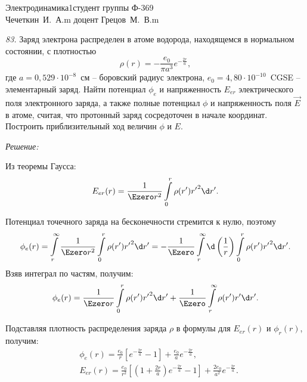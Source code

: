 






{Электродинамика}{1}{}{студент группы Ф-369\\Чечеткин~И.~А.}{m}
{доцент Грецов~М.~В.}{m}

\newpage
\emph{83.} Заряд электрона распределен в атоме водорода, находящемся в
нормальном состоянии, с плотностью
\[
  \rho(r) = -\frac{e_0}{\pi a^3}e^{-\frac{2r}{a}},
\]
где \( a = 0,529\cdot10^{-8} \)~см -- боровский радиус электрона,
\( e_0 = 4,80\cdot10^{-10} \)~CGSE -- элементарный заряд. Найти потенциал
\( \phi_e \) и напряженность \( E_{er} \) электрического поля электронного заряда,
а также полные потенциал \( \phi \) и напряженность поля \( \vec{E} \) в атоме,
считая, что протонный заряд сосредоточен в начале координат. Построить
приблизительный ход величин \( \phi \) и \( E \).

\vspace*{2em}
\emph{Решение:}
    
    Из теоремы Гаусса:
    \[
        E_{er}(r) = \frac{1}{\Ezero r^2} \int\limits_0^r \rho(r'){r'}^2\d r'.
    \]
    
    Потенциал точечного заряда на бесконечности стремится к нулю, поэтому
    \[
        \phi_e(r) = \int\limits_r^\infty \frac{1}{\Ezero r^2}\int\limits_0^r \rho(r')
        {r'}^2\d r' = -\frac{1}{\Ezero}\int\limits_r^\infty \d\left(\frac{1}{r}
        \right)\int\limits_0^r \rho(r'){r'}^2\d r'.
    \]
    Взяв интеграл по частям, получим:
    \[
        \phi_e(r) = \frac{1}{\Ezero r}\int\limits_0^r \rho(r'){r'}^2\d r' +
        \frac{1}{\Ezero}\int\limits_r^\infty \rho(r')r'\d r'.
    \]
    
    Подставляя плотность распределения заряда \( \rho \) в формулы для
    \( E_{er}(r) \) и \( \phi_r(r) \), получим:
    \begin{align*}
        & \phi_e(r) = \frac{e_0}{r}\left[e^{-\frac{2r}{a}} - 1\right] +
        \frac{e_0}{a}e^{-\frac{2r}{a}}, \\
        & E_{er}(r) = \frac{e_0}{r^2}\left[\left(1 + \frac{2r}{a}\right)
        e^{-\frac{2r}{a}} - 1\right] + \frac{2e_0}{a^2}e^{-\frac{2r}{a}}.
    \end{align*}
    
